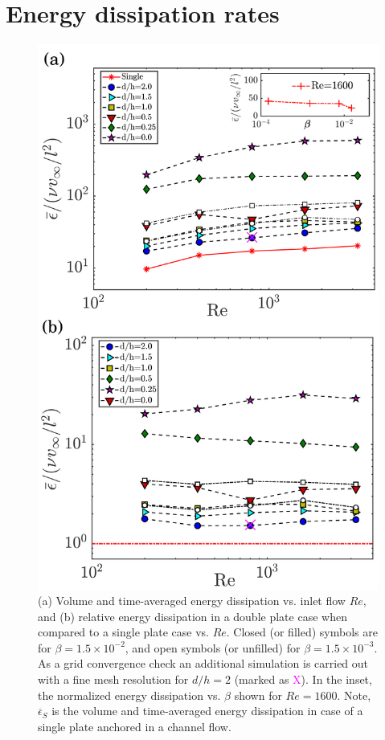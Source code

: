\documentclass[aps,pre,twocolumn,aps,longbibliography]{revtex4-1}
\begin{document}
	\section{Energy dissipation rates}
	
	
	\begin{figure}
		\begin{minipage}[c]{1\linewidth}
			\includegraphics[width=0.85\linewidth]{Fig17.pdf} 
		\end{minipage} 
		\caption{(a) Volume and time-averaged energy dissipation vs. inlet flow $Re$, and (b) relative energy dissipation in a double plate case when compared to a single plate case vs. $Re$. Closed (or filled) symbols are for $\beta=1.5\times 10^{-2}$, and open symbols (or unfilled) for $\beta=1.5\times 10^{-3}$. As a grid convergence check an additional simulation is carried out with a fine mesh resolution for $d/h=2$ (marked as \textcolor{magenta}{ \large{X}}). In the inset, the normalized energy dissipation vs. $\beta$ shown for $Re=1600$. Note, $\overline{\epsilon}_S$ is the volume and time-averaged energy dissipation in case of a single plate anchored in a channel flow.}
		\label{fig:ener_1a}
	\end{figure}
	
\end{document}
